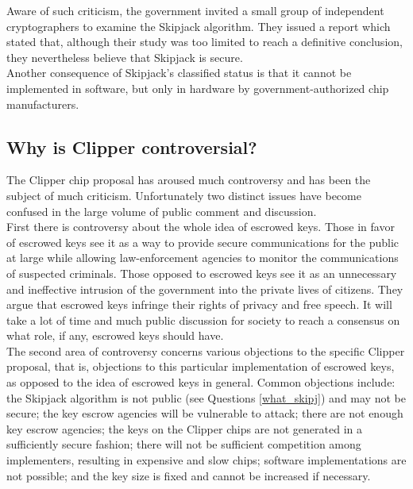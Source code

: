 Aware of such criticism, the government invited a small group of
independent cryptographers to examine the Skipjack algorithm. They
issued a report which stated that, although their study was too limited
to reach a definitive conclusion, they nevertheless believe that
Skipjack is secure.\\

Another consequence of Skipjack's classified status is that it cannot
be implemented in software, but only in hardware by
government-authorized chip manufacturers.

\subsection{Why is Clipper controversial?}

The Clipper chip proposal has aroused much controversy and has been the
subject of much criticism. Unfortunately two distinct issues have
become confused in the large volume of public comment and discussion.\\

First there is controversy about the whole idea of escrowed keys. Those
in favor of escrowed keys see it as a way to provide secure
communications for the public at large while allowing law-enforcement
agencies to monitor the communications of suspected criminals. Those
opposed to escrowed keys see it as an unnecessary and ineffective
intrusion of the government into the private lives of citizens. They
argue that escrowed keys infringe their rights of privacy and free
speech. It will take a lot of time and much public discussion for
society to reach a consensus on what role, if any, escrowed keys should
have.\\

The second area of controversy concerns various objections to the specific
Clipper proposal, that is, objections to this particular implementation of
escrowed keys, as opposed to the idea of escrowed keys in general. Common
objections include: the Skipjack algorithm is not public (see Questions
\ref{what_skipj}) and may not be secure; the key escrow agencies will be
vulnerable to attack; there are not enough key escrow agencies; the keys on
the Clipper chips are not generated in a sufficiently secure fashion; there
will not be sufficient competition among implementers, resulting in
expensive and slow chips; software implementations are not possible; and
the key size is fixed and cannot be increased if necessary.\\

